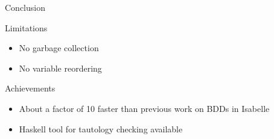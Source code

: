 \documentclass[%
	sans,
	12pt,
]{beamer}
\begin{document}
\begin{frame}{Conclusion}
	\begin{block}{Limitations}
		\begin{itemize}
			\item No garbage collection
			\item No variable reordering
		\end{itemize}
	\end{block}
	\begin{block}{Achievements}
		\begin{itemize}
			\item About a factor of 10 faster than previous work on BDDs in Isabelle
			\item Haskell tool for tautology checking available
		\end{itemize}
	\end{block}
\end{frame}
\end{document}
